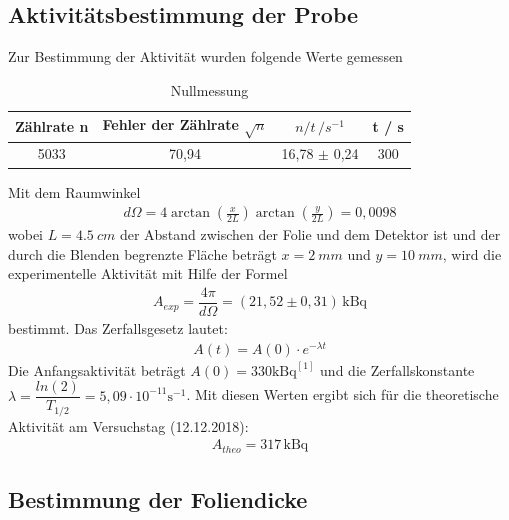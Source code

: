 \documentclass{article}
\begin{document}
\subsection{Aktivitätsbestimmung der Probe}

Zur Bestimmung der Aktivität wurden folgende Werte gemessen


\begin{table}[H] 
	\centering
	\begin{tabular}{c|c|c|c}
		
		Zählrate n  & Fehler der Zählrate $\sqrt{n}$ & $n/t \, / s^{-1}$& t / s \\ 
		\hline 
		5033&70,94 & 16,78 $ \pm$ 0,24&300\\

		
	\end{tabular} 
	\caption{Nullmessung } 
\end{table} 
Mit dem Raumwinkel 
\begin{align}
d\Omega= 4 \arctan\left(\frac{x}{2L}\right) \arctan\left(\frac{y}{2L} \right) =0,0098
\end{align}
wobei $L=\SI{4,5}{cm}$ der Abstand zwischen der Folie und dem Detektor ist und der durch die Blenden begrenzte Fläche beträgt $x=\SI{2}{mm}$ und $y=\SI{10}{mm}$,
wird die experimentelle Aktivität mit Hilfe der Formel 
\begin{align}
A_{exp}=\dfrac{4\pi}{d\Omega}=(21,52 \pm 0,31) \, \text{kBq}
\end{align}
bestimmt.  Das Zerfallsgesetz lautet:
\begin{align}
A(t)=A(0)\cdot e^{-\lambda t}
\end{align}
Die Anfangsaktivität beträgt $A(0)=330 \text{kBq}^{[1]}$ und die Zerfallskonstante $\lambda= \dfrac{ln(2)}{T_{1/2}}=5,09 \cdot 10^{-11} \text{s$^{-1}$}$. Mit diesen Werten ergibt sich für die theoretische Aktivität am Versuchstag (12.12.2018):
\begin{align*}
A_{theo}=317\, \text{kBq}
\end{align*}



\subsection{Bestimmung der Foliendicke }
\end{document}
